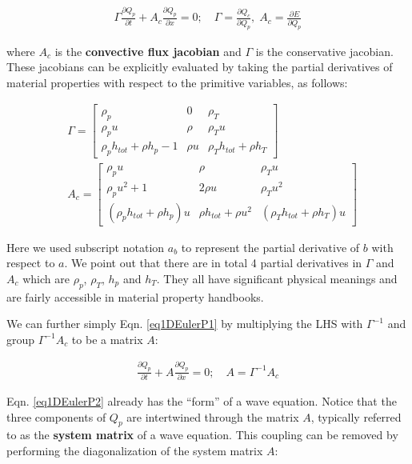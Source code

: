 \documentclass[12pt, letterpaper]{report}
\begin{document}
\begin{align}\label{eq1DEulerP1}
   \Gamma \frac{\partial Q_p}{\partial t} + A_c \frac{\partial Q_p}{\partial x} = 0; \quad \Gamma =
   \frac{\partial Q_c}{\partial Q_p}, \; A_c = \frac{\partial E}{\partial Q_p}
\end{align}

where $A_c$ is the {\bf convective flux jacobian} and $\Gamma$ is the conservative jacobian. These
jacobians can be explicitly evaluated by taking the partial derivatives of material properties with
respect to the primitive variables, as follows:

\begin{align*}
   &\Gamma = \begin{bmatrix}
      \rho_p & 0 & \rho_T \\
      \rho_p u & \rho & \rho_T u \\
      \rho_p h_{tot} + \rho h_p - 1 & \rho u & \rho_T h_{tot} + \rho h_T
   \end{bmatrix} \\
   &A_c = \begin{bmatrix}
      \rho_p u & \rho & \rho_T u \\
      \rho_p u^2 + 1 & 2\rho u & \rho_T u^2 \\
      (\rho_p h_{tot} + \rho h_p)u & \rho h_{tot} + \rho u^2 & (\rho_T h_{tot} + \rho h_T)u
      \end{bmatrix}
\end{align*}

Here we used subscript notation $a_b$ to represent the partial derivative of $b$ with respect to
$a$. We point out that there are in total 4 partial derivatives in $\Gamma$ and $A_c$ which are
$\rho_p$, $\rho_T$, $h_p$ and $h_T$. They all have significant physical meanings and are fairly
accessible in material property handbooks.\paraspace

We can further simply Eqn. \ref{eq1DEulerP1} by multiplying the LHS with $\Gamma^{-1}$ and group
$\Gamma^{-1}A_c$ to be a matrix $A$:

\begin{align}\label{eq1DEulerP2}
   \frac{\partial Q_p}{\partial t} + A \frac{\partial Q_p}{\partial x} = 0; \quad A = \Gamma^{-1}A_c
\end{align}

Eqn. \ref{eq1DEulerP2} already has the ``form'' of a wave equation. Notice that the three
components of $Q_p$ are intertwined through the matrix $A$, typically referred to as the {\bf
system matrix} of a wave equation. This coupling can be removed by performing the diagonalization of
the system matrix $A$:
\end{document}
